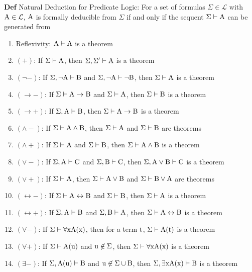\documentclass[11pt,notitlepage]{report}
\newcommand{\mc}[1]{\ensuremath{\mathcal{#1}}}
\newcommand{\tbf}[1]{\textbf{#1}}
\begin{document}
\tbf{Def} Natural Deduction for Predicate Logic: For a set of formulas $\Sigma \in \mc L$ with $\rm A \in \mc L$, $\rm A$ is formally deducible from $\Sigma$ if and only if the sequent $\Sigma \vdash \rm A$ can be generated from 
\vspace{-4mm}
\begin{enumerate}
    \item Reflexivity: $\rm A \vdash \rm A$ is a theorem
    \item $(+)$: If $\Sigma \vdash \rm A$, then $\Sigma, \Sigma' \vdash \rm A$ is a theorem
    \item $(\neg -)$: If $\Sigma, \neg \rm A \vdash \rm B$ and $\Sigma, \neg \rm A \vdash \neg \rm B$, then $\Sigma \vdash \rm A$ is a theorem
    \item $(\to -)$: If $\Sigma \vdash \rm A \to \rm B$ and $\Sigma \vdash \rm A$, then $\Sigma \vdash \rm B$ is a theorem
    \item $(\to +)$: If $\Sigma, \rm A \vdash \rm B$, then $\Sigma \vdash \rm A \to \rm B$ is a theorem
    \item $(\wedge -)$: If $\Sigma \vdash \rm A \wedge \rm B$, then $\Sigma \vdash \rm A$ and $\Sigma \vdash \rm B$ are theorems
    \item $(\wedge +)$: If $\Sigma \vdash \rm A$ and $\Sigma \vdash \rm B$, then $\Sigma \vdash \rm A \wedge \rm B$ is a theorem
    \item $(\vee -)$: If $\Sigma, \rm A \vdash \rm C$ and $\Sigma, \rm B \vdash \rm C$, then $\Sigma, \rm A \vee \rm B \vdash \rm C$ is a theorem
    \item $(\vee +)$: If $\Sigma \vdash \rm A$, then $\Sigma \vdash \rm A \vee \rm B$ and $\Sigma \vdash \rm B \vee A$ are theorems
    \item $(\leftrightarrow -)$: If $\Sigma \vdash \rm A \leftrightarrow \rm B$ and $\Sigma \vdash \rm B$, then $\Sigma \vdash \rm A$ is a theorem
    \item $(\leftrightarrow + )$: If $\Sigma, \rm A \vdash \rm B$ and $\Sigma, \rm B \vdash \rm A$, then $\Sigma \vdash \rm A \leftrightarrow \rm B$ is a theorem
    \item $(\forall -)$: If $\Sigma \vdash \rm \forall x A(x)$, then for a term $\rm t$, $\Sigma \vdash \rm A(t)$ is a theorem
    \item $(\forall +)$: If $\Sigma \vdash \rm A(u)$ and $\rm u \not \in \Sigma$, then $\rm \Sigma \vdash \forall x \rm A(x)$ is a theorem
    \item $(\exists -)$: If $\rm \Sigma, A(u) \vdash B$ and $\rm u \not \in \Sigma \cup \rm B$, then $\rm \Sigma, \exists x A(x) \vdash B$ is a theorem

\end{enumerate}
\end{document}
